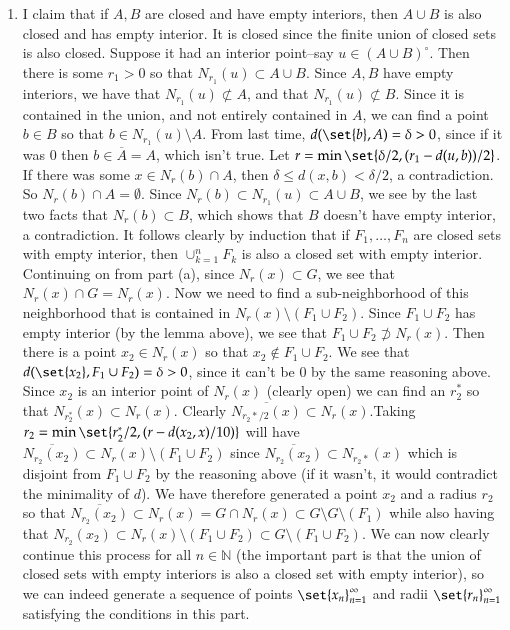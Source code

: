 \documentclass[12pt]{article}
\def\mbb#1{\mathbb{#1}}
\def\bN{\mbb{N}}
\theoremstyle{definition}
\theoremstyle{remark}
\begin{document}
\begin{enumerate}[leftmargin=\labelsep]
\begin{enumerate}
			\item I claim that if $A, B$ are closed and have empty interiors, then $A \cup B$ is also closed and has empty interior. It is closed since the finite union of closed sets is also closed. Suppose it had an interior point--say $u \in (A \cup B)^{\circ}$. Then there is some $r_1 > 0$ so that $N_{r_1}(u) \subset A \cup B$. Since $A, B$ have empty interiors, we have that $N_{r_1}(u) \not \subset A$, and that $N_{r_1}(u) \not \subset B$. Since it is contained in the union, and not entirely contained in $A$, we can find a point $b \in B$ so that $b \in N_{r_1}(u) \setminus A$. From last time, $d(\set{b}, A) = \delta > 0$, since if it was $0$ then $b \in \overline{A} = A$, which isn't true. Let $r = \min\set{\delta/2, (r_1-d(u,b))/2}$. If there was some $x \in N_r(b) \cap A$, then $\delta \leq d(x, b) < \delta/2$, a contradiction. So $N_r(b) \cap A = \emptyset$. Since $N_r(b) \subset N_{r_1}(u) \subset A \cup B$, we see by the last two facts that $N_r(b) \subset B$, which shows that $B$ doesn't have empty interior, a contradiction. It follows clearly by induction that if $F_1, \ldots, F_n$ are closed sets with empty interior, then $\cup_{k=1}^n F_k$ is also a closed set with empty interior. Continuing on from part (a), since $N_r(x) \subset G$, we see that $N_r(x) \cap G = N_r(x)$. Now we need to find a sub-neighborhood of this neighborhood that is contained in $N_r(x) \setminus (F_1 \cup F_2)$. Since $F_1 \cup F_2$ has empty interior (by the lemma above), we see that $F_1 \cup F_2 \not \supset N_r(x)$. Then there is a point $x_2 \in N_r(x)$ so that $x_2 \not \in F_1 \cup F_2$. We see that $d(\set{x_2}, F_1 \cup F_2) = \delta > 0$, since it can't be 0 by the same reasoning above. Since $x_2$ is an interior point of $N_r(x)$ (clearly open) we can find an $r_2^*$ so that $N_{r_2^*}(x) \subset N_r(x)$. Clearly $\overline{N_{r_2*/2}(x)} \subset N_r(x)$.Taking $r_2 = \min\set{r_2^*/2, (r-d(x_2, x)/10)}$ will have $\overline{N_{r_2}(x_2)} \subset N_r(x) \setminus (F_1 \cup F_2)$ since $\overline{N_{r_2}(x_2)} \subset N_{r_2*}(x)$ which is disjoint from $F_1 \cup F_2$ by the reasoning above (if it wasn't, it would contradict the minimality of $d$). We have therefore generated a point $x_2$ and a radius $r_2$ so that $\overline{N_{r_2}(x_2)} \subset N_r(x) = G \cap N_r(x) \subset G \setminus G \setminus (F_1)$ while also having that $N_{r_2}(x_2) \subset N_r(x) \setminus (F_1 \cup F_2) \subset G \setminus (F_1 \cup F_2)$. We can now clearly continue this process for all $n \in \bN$ (the important part is that the union of closed sets with empty interiors is also a closed set with empty interior), so we can indeed generate a sequence of points $\set{x_n}_{n=1}^\infty$ and radii $\set{r_n}_{n=1}^\infty$ satisfying the conditions in this part.			

\end{enumerate}
\end{enumerate}
\end{document}
